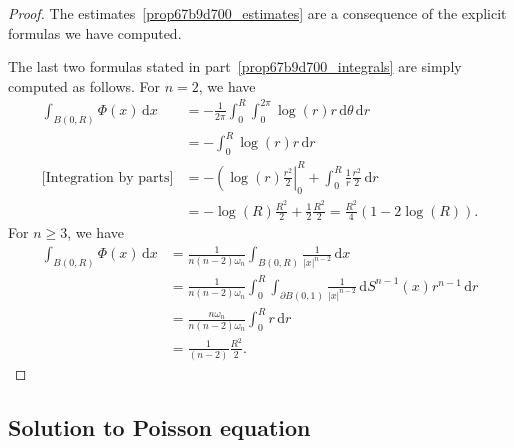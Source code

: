 \documentclass[a4paper,9pt]{amsart}
\newcommand{\did}{\,\mathrm{d}}	%
\newcommand{\de}{\partial}		%
\theoremstyle{plain}
\theoremstyle{definition}
\theoremstyle{remark}
\begin{document}
\begin{proof}
	The estimates~\ref{prop67b9d700_estimates} are a consequence of the explicit formulas we have computed.
	
	The last two formulas stated in part~\ref{prop67b9d700_integrals} are simply computed as follows.
	For $n=2$, we have
	\begin{align*}
		\int_{B(0,R)} \Phi(x)\did x
		&= - \frac1{2\pi} \int_0^R\int_0^{2\pi} \log(r) r \did\theta\did r \\
		&= - \int_0^R \log(r) r\did r \\
		\text{[Integration by parts]} 
		&= -\left(\log(r)\frac{r^2}{2}\right|_0^R + \int_0^R \frac1r \frac{r^2}{2} \did r \\
		&= - \log(R) \frac{R^2}{2} + \frac12 \frac{R^2}{2} 
		=  \frac{R^2}{4} (1 - 2\log(R)) .
	\end{align*}
	For $n\ge3$, we have
	\begin{align*}
		\int_{B(0,R)} \Phi(x)\did x
		&= \frac1{n(n-2)\omega_n } \int_{B(0,R)} \frac1{|x|^{n-2}} \did x \\
		&= \frac1{n(n-2)\omega_n } \int_0^R \int_{\de B(0,1)} \frac1{|x|^{n-2}} \did S^{n-1}(x) r^{n-1} \did r \\
		&= \frac{n\omega_n }{n(n-2)\omega_n } \int_0^R r \did r \\
		&= \frac1{(n-2)} \frac{R^2}{2} .
	\end{align*}
\end{proof}

\subsection{Solution to Poisson equation}\label{subs67ba081a}
\end{document}
